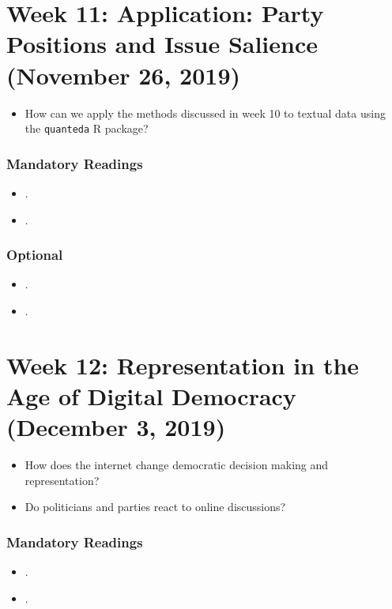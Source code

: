 \documentclass[abstract=on,parskip=full,headings=standardclasses,fontsize=11pt,paper=a4]{scrartcl}
\begin{document}
\section{Week 11:  Application: Party Positions and Issue Salience (November 26, 2019)}

\begin{itemize}
\renewcommand\labelitemi{--}
\item How can we apply the methods discussed in week 10 to textual data using the \texttt{quanteda} \textsf{R} package?
\end{itemize}

\subsubsection*{Mandatory Readings}
\begin{itemize}
\item {}.
\item {}.
\end{itemize}


\subsubsection*{Optional}
\begin{itemize}
\item {}.
\item {}.
\end{itemize}





\section{Week 12: Representation in the Age of Digital Democracy (December 3, 2019)}


\begin{itemize}
\renewcommand\labelitemi{--}
\item How does the internet change democratic decision making and representation?
\item Do politicians and parties react to online discussions?
\end{itemize}

\subsubsection*{Mandatory Readings}
\begin{itemize}
\item {}.
\item {}.
\end{itemize}
\end{document}
